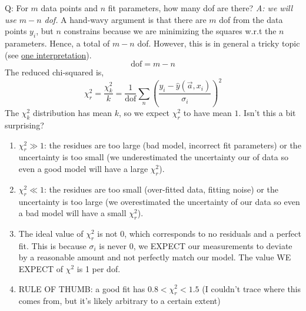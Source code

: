 \documentclass[12pt]{article}
\numberwithin{equation}{section}
\begin{document}
\begin{itemize}
Q: For $ m $ data points and $ n $ fit parameters, how many dof are there? \textit{A: we will use $ m-n$ dof.} A hand-wavy argument is that there are $ m $ dof from the data points $ y_i $, but $ n $ constrains because we are minimizing the squares w.r.t the $ n $ parameters. Hence, a total of $ m-n $ dof. However, this is in general a tricky topic (see \href{https://arxiv.org/abs/1012.3754}{one interpretation}).
\begin{equation}
		\text{dof} = m-n
\end{equation}
The reduced chi-squared is,
\begin{equation}
		\boxed{ \chi^2_r = \frac{\chi^2_k}{k} = \frac{1}{\text{dof}}\sum_n 	\left(\frac{y_i - \hat{y}(\vec{a}, x_i) }{\sigma_i}\right)^2}
\end{equation}
The $ \chi^2_k $ distribution has mean $ k $, so we expect $ \chi^2_r $ to have mean $ 1 $. Isn't this a bit surprising?
\begin{enumerate}
	\item $ \chi^2_r \gg 1$: the residues are too large (bad model, incorrect fit parameters) or the uncertainty is too small (we underestimated the uncertainty our of data so even a good model will have a large $ \chi^2_r $).
	\item $ \chi^2_r \ll 1$: the residues are too small (over-fitted data, fitting noise) or the uncertainty is too large (we overestimated the uncertainty of our data so even a bad model will have a small $ \chi^2_r $).
	\item The ideal value of $ \chi^2_r $ is not 0, which corresponds to no residuals and a perfect fit. This is because $ \sigma_i $ is never 0, we EXPECT our measurements to deviate by a reasonable amount and not perfectly match our model. The value WE EXPECT of $\chi^2  $ is 1 per dof.
	\item RULE OF THUMB: a good fit has $ 0.8<\chi^2_r <1.5 $ (I couldn't trace where this comes from, but it's likely arbitrary to a certain extent)
\end{enumerate}


\end{itemize}
\end{document}
